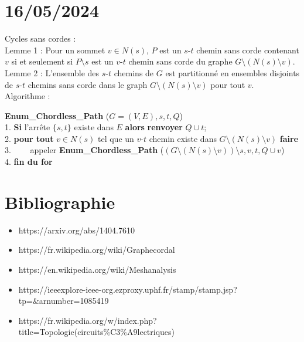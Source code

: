 \documentclass[11pt]{article}
\begin{document}
\section{16/05/2024}
Cycles sans cordes : \\
Lemme 1 :		    Pour un sommet $v\in N(s)$,
 $P$ est un $s$-$t$ chemin sans corde contenant $v$ si et seulement si
 $P\setminus s$ est un $v$-$t$ chemin sans corde du graphe
 $G\setminus (N(s) \setminus v)$. \\


Lemme 2 : L'ensemble des $s$-$t$ chemins de $G$ est partitionné en ensembles disjoints de $s$-$t$ chemins sans corde dans le graph
 $G\setminus (N(s) \setminus v)$ pour tout $v$. \\

\newpage
Algorithme : \\
\begin{tabbing}
{\bf Enum\_Chordless\_Path} ($G=(V,E), s, t, Q$)\\
	1. {\bf Si} l'arrête $\{ s, t\}$ existe dans $E$ {\bf alors} {\bf renvoyer} $Q \cup t$;\\
2. {\bf pour tout} $v\in N(s)$ tel que un $v$-$t$ chemin existe dans
 $G\setminus (N(s) \setminus v)$ {\bf faire}\\
3. \ \  \ \ appeler {\bf Enum\_Chordless\_Path} ($(G\setminus (N(s)\setminus
  v))\setminus s, v, t, Q\cup v$)\\
4. {\bf fin du for}
\end{tabbing}
\newpage
   \section{Bibliographie}
   \begin{itemize}
	\item https://arxiv.org/abs/1404.7610 
	\item https://fr.wikipedia.org/wiki/Graphe\textunderscore cordal
	\item https://en.wikipedia.org/wiki/Mesh\textunderscore analysis
	\item https://ieeexplore-ieee-org.ezproxy.uphf.fr/stamp/stamp.jsp?tp=\&arnumber=1085419
	\item https://fr.wikipedia.org/w/index.php?title=Topologie\textunderscore (circuits\textunderscore \%C3\%A9lectriques)
\end{itemize}
    
\end{document}

